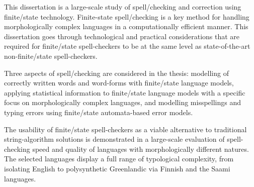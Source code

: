 This dissertation is a large-scale study of spell\-/checking and correction
using finite\-/state technology. Finite-state spell\-/checking is a key method
for handling morphologically complex languages in a computationally
efficient manner. This dissertation goes through technological and practical
considerations that are required for finite\-/state spell-checkers to be at
the same level as state-of-the-art non-finite\-/state spell-checkers. 

Three aspects of spell\-/checking are considered in the thesis: modelling of
correctly written words and word-forms with finite\-/state language
models, applying statistical information to finite\-/state language models
with a specific focus on morphologically complex languages, and modelling
misspellings and typing errors using finite\-/state automata-based error
models.

The usability of finite\-/state spell-checkers as a viable alternative to
traditional string-algorithm solutions is demonstrated in a large-scale
evaluation of spell-checking speed and quality of languages with
morphologically different natures. The selected languages display a
full range of typological complexity, from isolating English to 
polysynthetic Greenlandic via Finnish and the Saami languages.
